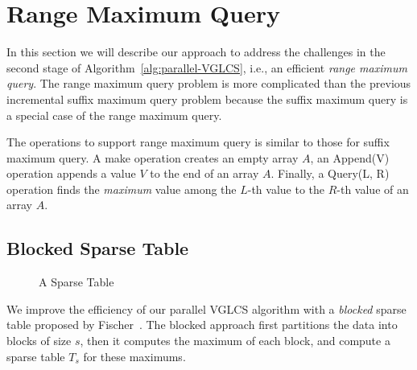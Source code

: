 \section{Range Maximum Query} \label{sec:parallelRMQ}

In this section we will describe our approach to address the challenges
in the second stage of Algorithm~\ref{alg:parallel-VGLCS}, i.e., an
efficient {\em range maximum query}.  The range maximum query problem is
more complicated than the previous incremental suffix maximum query
problem because the suffix maximum query is a special case of the range
maximum query.

The operations to support range maximum query is similar to those for
suffix maximum query.  A {\sc make} operation creates an empty array
$A$, an {\sc Append(V)} operation appends a value $V$ to the end of an
array $A$.  Finally, a {\sc Query(L, R)} operation finds the {\em
  maximum} value among the $L$-th value to the $R$-th value of an
array $A$.


\subsection{Blocked Sparse Table} \label{sec:blocked-sparse-table}

\begin{figure}[!thb]
  \centering {} 
  \caption{A Sparse Table}
  \label{fig:block-interval-decomposition}
\end{figure}

We improve the efficiency of our parallel VGLCS algorithm with a {\em
  blocked} sparse table proposed by
Fischer~\cite{Fischer2006TheoreticalAP}.  The blocked approach first
partitions the data into blocks of size $s$, then it computes the
maximum of each block, and compute a sparse table $T_s$ for these
maximums.

